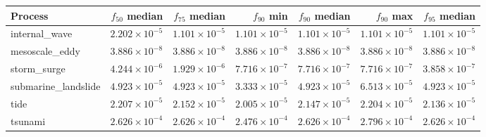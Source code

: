 \begin{tabular}{lrrrrrr}
\toprule
Process & $f_{50}$ median & $f_{75}$ median & $f_{90}$ min & $f_{90}$ median & $f_{90}$ max & $f_{95}$ median \\
\midrule
internal\_wave & $2.202\times10^{-5}$ & $1.101\times10^{-5}$ & $1.101\times10^{-5}$ & $1.101\times10^{-5}$ & $1.101\times10^{-5}$ & $1.101\times10^{-5}$ \\
mesoscale\_eddy & $3.886\times10^{-8}$ & $3.886\times10^{-8}$ & $3.886\times10^{-8}$ & $3.886\times10^{-8}$ & $3.886\times10^{-8}$ & $3.886\times10^{-8}$ \\
storm\_surge & $4.244\times10^{-6}$ & $1.929\times10^{-6}$ & $7.716\times10^{-7}$ & $7.716\times10^{-7}$ & $7.716\times10^{-7}$ & $3.858\times10^{-7}$ \\
submarine\_landslide & $4.923\times10^{-5}$ & $4.923\times10^{-5}$ & $3.333\times10^{-5}$ & $4.923\times10^{-5}$ & $6.513\times10^{-5}$ & $4.923\times10^{-5}$ \\
tide & $2.207\times10^{-5}$ & $2.152\times10^{-5}$ & $2.005\times10^{-5}$ & $2.147\times10^{-5}$ & $2.204\times10^{-5}$ & $2.136\times10^{-5}$ \\
tsunami & $2.626\times10^{-4}$ & $2.626\times10^{-4}$ & $2.476\times10^{-4}$ & $2.626\times10^{-4}$ & $2.796\times10^{-4}$ & $2.626\times10^{-4}$ \\
\bottomrule
\end{tabular}

